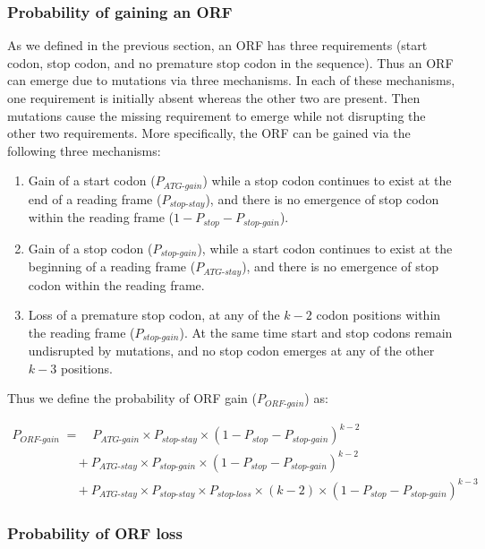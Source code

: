 \documentclass[12pt,a4paper]{article}
\begin{document}
\subsubsection{Probability of gaining an ORF}

As we defined in the previous section, an ORF has three requirements (start codon, stop codon, and no premature stop codon in the sequence). Thus an ORF can emerge due to mutations via three mechanisms. In each of these mechanisms, one requirement is initially absent whereas the other two are present. Then mutations cause the missing requirement to emerge while not disrupting the other two requirements. More specifically, the ORF can be gained via the following three mechanisms:
\begin{enumerate}
\item Gain of a start codon ($P_\textit{ATG-gain}$) while a stop codon continues to exist at the end of a reading frame ($P_\textit{stop-stay}$), and there is no emergence of stop codon within the reading frame ($1- P_\textit{stop} - P_\textit{stop-gain}$).
\item Gain of a stop codon ($P_\textit{stop-gain}$), while a start codon continues to exist at the beginning of a reading frame ($P_\textit{ATG-stay}$), and there is no emergence of stop codon within the reading frame.
\item Loss of a premature stop codon, at any of the $k-2$ codon positions within the reading frame ($P_\textit{stop-gain}$). At the same time start and stop codons remain undisrupted by mutations, and no stop codon emerges at any of the other $k-3$ positions.
\end{enumerate} 

Thus we define the probability of ORF gain ($P_\textit{ORF-gain}$) as:

\begin{align}
P_\textit{ORF-gain} & = \quad P_\textit{ATG-gain}\times P_\textit{stop-stay} \times (1- P_\textit{stop} - P_\textit{stop-gain})^{k-2} \nonumber \\[1pt]
& \quad + P_\textit{ATG-stay}\times P_\textit{stop-gain} \times (1- P_\textit{stop} - P_\textit{stop-gain})^{k-2} \nonumber \\[1pt]
& \quad + P_\textit{ATG-stay}\times P_\textit{stop-stay} \times P_\textit{stop-loss}\times(k-2) \times (1- P_\textit{stop} - P_\textit{stop-gain})^{k-3} 
\label{eqorfgain}
\end{align}

\subsubsection{Probability of ORF loss}
\end{document}
